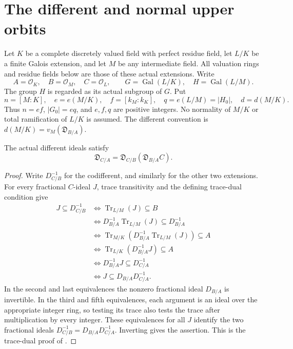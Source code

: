 \section{The different and normal upper orbits}

Let $K$ be a complete discretely valued field with perfect residue field,
let $L/K$ be a finite Galois extension, and let $M$ be any intermediate
field. All valuation rings and residue fields below are those of these
actual extensions. Write
\[
 A=\mathcal O_K,\quad B=\mathcal O_M,\quad C=\mathcal O_L,\qquad
 G=\operatorname{Gal}(L/K),\quad H=\operatorname{Gal}(L/M).
\]
The group $H$ is regarded as its actual subgroup of $G$. Put
\[
 n=[M:K],\quad e=e(M/K),\quad f=[k_M:k_K],\quad
 q=e(L/M)=|H_0|,\quad d=d(M/K).
\]
Thus $n=ef$, $|G_0|=eq$, and $e,f,q$ are positive integers. No
normality of $M/K$ or total ramification of $L/K$ is assumed.
The different convention is
$d(M/K)=v_M(\mathfrak D_{B/A})$.

\begin{lemma}
\label{fw:different-ideal-transitivity}
\mathlibok
The actual different ideals satisfy
\[
 \mathfrak D_{C/A}=\mathfrak D_{C/B}(\mathfrak D_{B/A}C).
\]
\end{lemma}
\begin{proof}
Write $D_{C/B}^{-1}$ for the codifferent, and similarly for the other
two extensions. For every fractional $C$-ideal $J$, trace transitivity
and the defining trace-dual condition give
\[
\begin{aligned}
 J\subseteq D_{C/B}^{-1}
 &\Longleftrightarrow \operatorname{Tr}_{L/M}(J)\subseteq B\\
 &\Longleftrightarrow
 D_{B/A}^{-1}\operatorname{Tr}_{L/M}(J)\subseteq D_{B/A}^{-1}\\
 &\Longleftrightarrow
 \operatorname{Tr}_{M/K}
   (D_{B/A}^{-1}\operatorname{Tr}_{L/M}(J))\subseteq A\\
 &\Longleftrightarrow
 \operatorname{Tr}_{L/K}(D_{B/A}^{-1}J)\subseteq A\\
 &\Longleftrightarrow D_{B/A}^{-1}J\subseteq D_{C/A}^{-1}\\
 &\Longleftrightarrow J\subseteq D_{B/A}D_{C/A}^{-1}.
\end{aligned}
\]
In the second and last equivalences the nonzero fractional ideal
$D_{B/A}$ is invertible. In the third and fifth equivalences, each
argument is an ideal over the appropriate integer ring, so testing its
trace also tests the trace after multiplication by every integer.
These equivalences for all $J$ identify the two fractional ideals
$D_{C/B}^{-1}=D_{B/A}D_{C/A}^{-1}$. Inverting gives the assertion.
This is the trace-dual proof of \cite{Serre1979}.
\end{proof}

